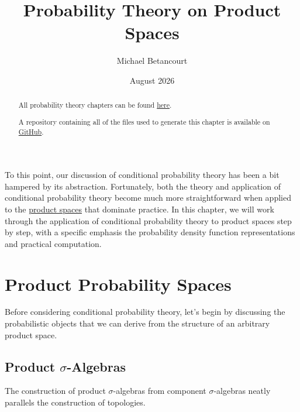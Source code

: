 \documentclass[
  letterpaper,
  DIV=11,
  numbers=noendperiod]{scrartcl}
\title{Probability Theory on Product Spaces}
\author{Michael Betancourt}
\date{August 2026}
\renewcommand*\contentsname{Table of contents}
\newcommand\contentsname{Table of contents}
\begin{document}
\maketitle
\begin{abstract}
All probability theory chapters can be found
\href{http://www.symplectomorphic.com/writing/\#part1}{here}.

A repository containing all of the files used to generate this chapter
is available on
\href{https://github.com/betanalpha/quarto_chapters/tree/main/10_probability_on_product_spaces}{GitHub}.
\end{abstract}

\renewcommand*\contentsname{Table of contents}
{
\hypersetup{linkcolor=}
\setcounter{tocdepth}{3}
\tableofcontents
}
\newcommand{\I}[2]{\mathbb{I}_{#1} \! \left[ #2 \right]}

\newcommand{\E}[2]{\mathbb{E}_{#1} \! \left[ #2 \right]}

\newcommand{\rnd}[2]{\frac{ \mathrm{d} #1}{ \mathrm{d} #2 }}

To this point, our discussion of conditional probability theory has been
a bit hampered by its abstraction. Fortunately, both the theory and
application of conditional probability theory become much more
straightforward when applied to the
\href{http://www.symplectomorphic.com/assets/chapters_html/product_spaces.html}{product
spaces} that dominate practice. In this chapter, we will work through
the application of conditional probability theory to product spaces step
by step, with a specific emphasis the probability density function
representations and practical computation.

\section{Product Probability Spaces}\label{product-probability-spaces}

Before considering conditional probability theory, let's begin by
discussing the probabilistic objects that we can derive from the
structure of an arbitrary product space.

\subsection{\texorpdfstring{Product
{\(\sigma\)}-Algebras}{Product \textbackslash sigma-Algebras}}\label{product-sigma-algebras}

The construction of product \(\sigma\)-algebras from component
\(\sigma\)-algebras neatly parallels the construction of topologies.
\end{document}
